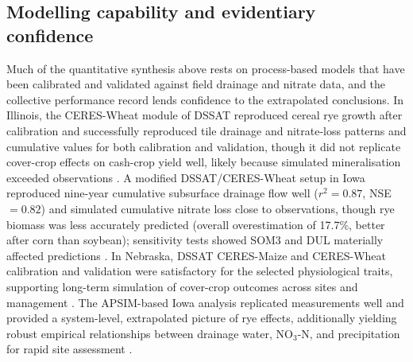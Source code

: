 \subsection{Modelling capability and evidentiary confidence}
Much of the quantitative synthesis above rests on process-based models that have been calibrated and validated against field drainage and nitrate data, and the collective performance record lends confidence to the extrapolated conclusions. In Illinois, the CERES-Wheat module of DSSAT reproduced cereal rye growth after calibration and successfully reproduced tile drainage and nitrate-loss patterns and cumulative values for both calibration and validation, though it did not replicate cover-crop effects on cash-crop yield well, likely because simulated mineralisation exceeded observations \parencite{Gupta2022}. A modified DSSAT/CERES-Wheat setup in Iowa reproduced nine-year cumulative subsurface drainage flow well ($r^2 = 0.87$, NSE $= 0.82$) and simulated cumulative nitrate loss close to observations, though rye biomass was less accurately predicted (overall overestimation of 17.7\%, better after corn than soybean); sensitivity tests showed SOM3 and DUL materially affected predictions \parencite{Chatterjee2025}. In Nebraska, DSSAT CERES-Maize and CERES-Wheat calibration and validation were satisfactory for the selected physiological traits, supporting long-term simulation of cover-crop outcomes across sites and management \parencite{Birru2023}. The APSIM-based Iowa analysis replicated measurements well and provided a system-level, extrapolated picture of rye effects, additionally yielding robust empirical relationships between drainage water, NO$_3$-N, and precipitation for rapid site assessment \parencite{MartinezFeria2016}.

